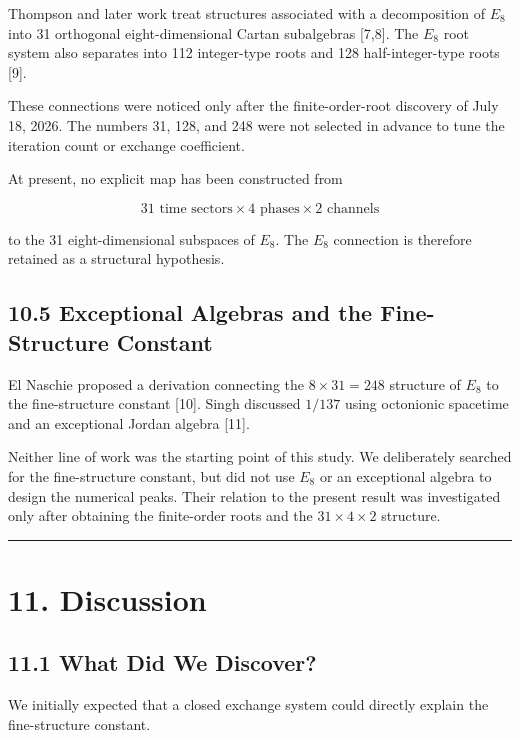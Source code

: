 \documentclass[
  10pt,
  a4paper,
]{article}
\begin{document}
Thompson and later work treat structures associated with a decomposition
of \(E_8\) into 31 orthogonal eight-dimensional Cartan subalgebras
{[}7,8{]}. The \(E_8\) root system also separates into 112 integer-type
roots and 128 half-integer-type roots {[}9{]}.

These connections were noticed only after the finite-order-root
discovery of July 18, 2026. The numbers 31, 128, and 248 were not
selected in advance to tune the iteration count or exchange coefficient.

At present, no explicit map has been constructed from

\[
31\text{ time sectors}\times
4\text{ phases}\times
2\text{ channels}
\]

to the 31 eight-dimensional subspaces of \(E_8\). The \(E_8\) connection
is therefore retained as a structural hypothesis.

\subsection{10.5 Exceptional Algebras and the Fine-Structure
Constant}\label{exceptional-algebras-and-the-fine-structure-constant}

El Naschie proposed a derivation connecting the \(8\times31=248\)
structure of \(E_8\) to the fine-structure constant {[}10{]}. Singh
discussed \(1/137\) using octonionic spacetime and an exceptional Jordan
algebra {[}11{]}.

Neither line of work was the starting point of this study. We
deliberately searched for the fine-structure constant, but did not use
\(E_8\) or an exceptional algebra to design the numerical peaks. Their
relation to the present result was investigated only after obtaining the
finite-order roots and the \(31\times4\times2\) structure.

\begin{center}\rule{0.5\linewidth}{0.5pt}\end{center}

\section{11. Discussion}\label{discussion}

\subsection{11.1 What Did We Discover?}\label{what-did-we-discover}

We initially expected that a closed exchange system could directly
explain the fine-structure constant.
\end{document}
